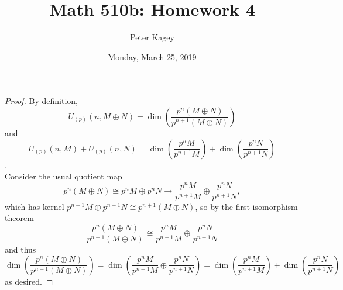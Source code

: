 \documentclass{article}
\newenvironment{problem}[2][Problem]{\begin{trivlist}
\item[\hskip \labelsep {\bfseries #1}\hskip \labelsep {\bfseries #2.}]}{\end{trivlist}}
\newcommand{\paren}[1]{\left( #1 \right)}
\begin{document}
\title{Math 510b: Homework 4}
\author{Peter Kagey}
\date{Monday, March 25, 2019}

\maketitle

\begin{problem}{8.7(i) (Rotman)}
\end{problem}

\begin{proof}
  By definition, \[
    U_{(p)}(n, M \oplus N) = \dim\paren{\frac{p^n(M \oplus N)}{p^{n+1}(M \oplus N)}}
  \] and \[
    U_{(p)}(n, M) + U_{(p)}(n, N) = \dim\paren{\frac{p^nM}{p^{n+1}M}} + \dim\paren{\frac{p^nN}{p^{n+1}N}}
  \]. \\
  Consider the usual quotient map \[
    p^n(M \oplus N) \cong p^nM \oplus p^nN \rightarrow \frac{p^nM}{p^{n+1}M} \oplus \frac{p^nN}{p^{n+1}N},
  \] which has kernel $p^{n+1}M \oplus p^{n+1}N \cong p^{n+1}(M \oplus N)$,
  so by the first isomorphism theorem \[
    \frac{p^n(M \oplus N)}{p^{n+1}(M \oplus N)} \cong \frac{p^nM}{p^{n+1}M} \oplus \frac{p^nN}{p^{n+1}N}
  \] and thus \[
  \dim\paren{\frac{p^n(M \oplus N)}{p^{n+1}(M \oplus N)}}
  = \dim\paren{\frac{p^nM}{p^{n+1}M} \oplus \frac{p^nN}{p^{n+1}N}}
  = \dim\paren{\frac{p^nM}{p^{n+1}M}} + \dim\paren{\frac{p^nN}{p^{n+1}N}}
  \] as desired.
\end{proof}
\pagebreak
\end{document}
